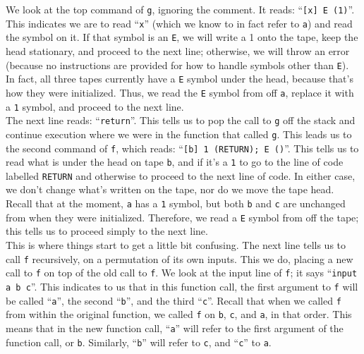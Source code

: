 \documentclass[11pt]{article}
\begin{document}
We look at the top command of \texttt{g}, ignoring the comment. It reads: ``\texttt{[x] E (1)}''. This indicates we are to read ``\texttt{x}'' (which we know to in fact refer to \texttt{a}) and read the symbol on it. If that symbol is an \texttt{E}, we will write a 1 onto the tape, keep the head stationary, and proceed to the next line; otherwise, we will throw an error (because no instructions are provided for how to handle symbols other than \texttt{E}). \\

In fact, all three tapes currently have a \texttt{E} symbol under the head, because that's how they were initialized. Thus, we read the \texttt{E} symbol from off \texttt{a}, replace it with a \texttt{1} symbol, and proceed to the next line. \\

The next line reads: ``\texttt{return}''. This tells us to pop the call to \texttt{g} off the stack and continue execution where we were in the function that called \texttt{g}. This leads us to the second command of \texttt{f}, which reads: ``\texttt{[b] 1 (RETURN); E ()}''. This tells us to read what is under the head on tape \texttt{b}, and if it's a \texttt{1} to go to the line of code labelled \texttt{RETURN} and otherwise to proceed to the next line of code. In either case, we don't change what's written on the tape, nor do we move the tape head. \\

Recall that at the moment, \texttt{a} has a \texttt{1} symbol, but both \texttt{b} and \texttt{c} are unchanged from when they were initialized. Therefore, we read a \texttt{E} symbol from off the tape; this tells us to proceed simply to the next line. \\

This is where things start to get a little bit confusing. The next line tells us to call \texttt{f} recursively, on a permutation of its own inputs. This we do, placing a new call to \texttt{f} on top of the old call to \texttt{f}. We look at the input line of \texttt{f}; it says ``\texttt{input a b c}''. This indicates to us that in this function call, the first argument to \texttt{f} will be called ``\texttt{a}'', the second ``\texttt{b}'', and the third ``\texttt{c}''. Recall that when we called \texttt{f} from within the original function, we called \texttt{f} on \texttt{b}, \texttt{c}, and \texttt{a}, in that order. This means that in the new function call, ``\texttt{a}'' will refer to the first argument of the function call, or \texttt{b}. Similarly, ``\texttt{b}'' will refer to \texttt{c}, and ``\texttt{c}'' to \texttt{a}. \\
\end{document}
